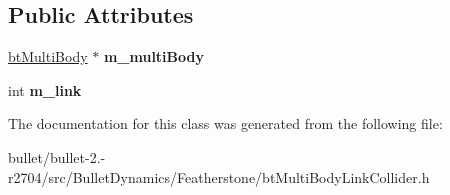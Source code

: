 \subsection*{Public Attributes}
\begin{DoxyCompactItemize}
\item 
\hypertarget{classbt_multi_body_link_collider_aa5c1118cc8c90d85d96d360195acdf1e}{\hyperlink{classbt_multi_body}{bt\+Multi\+Body} $\ast$ {\bfseries m\+\_\+multi\+Body}}\label{classbt_multi_body_link_collider_aa5c1118cc8c90d85d96d360195acdf1e}

\item 
\hypertarget{classbt_multi_body_link_collider_a5c6c0438e17774295ef34a2beb5c57c7}{int {\bfseries m\+\_\+link}}\label{classbt_multi_body_link_collider_a5c6c0438e17774295ef34a2beb5c57c7}

\end{DoxyCompactItemize}


The documentation for this class was generated from the following file\+:\begin{DoxyCompactItemize}
\item 
bullet/bullet-\/2.-\/r2704/src/\+Bullet\+Dynamics/\+Featherstone/bt\+Multi\+Body\+Link\+Collider.\+h\end{DoxyCompactItemize}
